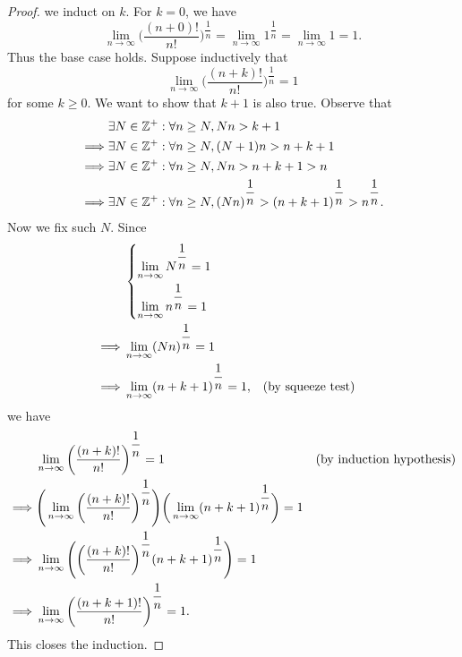 \begin{proof}
  we induct on \(k\).
  For \(k = 0\), we have
  \[
    \lim_{n \to \infty} \bigg(\dfrac{(n + 0)!}{n!}\bigg)^{\dfrac{1}{n}} = \lim_{n \to \infty} 1^{\dfrac{1}{n}} = \lim_{n \to \infty} 1 = 1.
  \]
  Thus the base case holds.
  Suppose inductively that
  \[
    \lim_{n \to \infty} \bigg(\dfrac{(n + k)!}{n!}\bigg)^{\dfrac{1}{n}} = 1
  \]
  for some \(k \geq 0\).
  We want to show that \(k + 1\) is also true.
  Observe that
  \begin{align*}
             & \exists N \in \mathbb{Z}^+ : \forall n \geq N, Nn > k + 1                                                           \\
    \implies & \exists N \in \mathbb{Z}^+ : \forall n \geq N, (N + 1)n > n + k + 1                                                 \\
    \implies & \exists N \in \mathbb{Z}^+ : \forall n \geq N, Nn > n + k + 1 > n                                                   \\
    \implies & \exists N \in \mathbb{Z}^+ : \forall n \geq N, (Nn)^{\dfrac{1}{n}} > (n + k + 1)^{\dfrac{1}{n}} > n^{\dfrac{1}{n}}.
  \end{align*}
  Now we fix such \(N\).
  Since
  \begin{align*}
             & \begin{dcases}
                 \lim_{n \to \infty} N^{\dfrac{1}{n}} = 1 \\ %
                 \lim_{n \to \infty} n^{\dfrac{1}{n}} = 1 %
               \end{dcases}                                \\
    \implies & \lim_{n \to \infty} (Nn)^{\dfrac{1}{n}} = 1                                                                          \\
    \implies & \lim_{n \to \infty} (n + k + 1)^{\dfrac{1}{n}} = 1,                                    &  & \text{(by squeeze test)}
  \end{align*}
  we have
  \begin{align*}
             & \lim_{n \to \infty} \bigg(\dfrac{(n + k)!}{n!}\bigg)^{\dfrac{1}{n}} = 1                                                                        &  & \text{(by induction hypothesis)} \\
    \implies & \Bigg(\lim_{n \to \infty} \bigg(\dfrac{(n + k)!}{n!}\bigg)^{\dfrac{1}{n}}\Bigg) \bigg(\lim_{n \to \infty} (n + k + 1)^{\dfrac{1}{n}}\bigg) = 1            \\
    \implies & \lim_{n \to \infty} \Bigg(\bigg(\dfrac{(n + k)!}{n!}\bigg)^{\dfrac{1}{n}} (n + k + 1)^{\dfrac{1}{n}}\Bigg) = 1                                            \\
    \implies & \lim_{n \to \infty} \bigg(\dfrac{(n + k + 1)!}{n!}\bigg)^{\dfrac{1}{n}} = 1.
  \end{align*}
  This closes the induction.
\end{proof}

